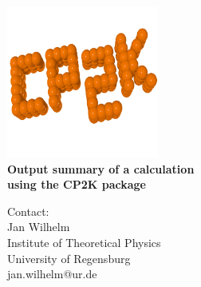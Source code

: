 \documentclass[11pt, a4paper]{scrartcl}
\begin{document}

\begin{titlepage}
  \sffamily
  \begin{center}
{
\includegraphics[width=5cm]{cp2k_logo.png}
\\[1em]
\Huge \bfseries Output summary of a \GW calculation\\[0.4em] using the CP2K package}
  \end{center}{\large
  \vspace{3em}
  Contact:
  \\[1em]
    Jan Wilhelm
      \\[0.5em]
    Institute of Theoretical Physics
    \\[0.5em]
    University of Regensburg
    \\[0.5em]
    jan.wilhelm@ur.de
    \\[3em]
    
\tableofcontents
  }
\end{titlepage}







\pagestyle{plain}






\pagestyle{fancy}
\end{document}

